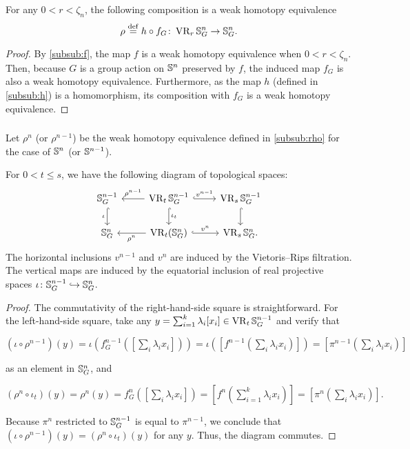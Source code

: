 \medskip\lemma
For any $0<r<\zeta_n$, the following composition is a weak homotopy equivalence
\[
\rho \stackrel{\mathrm{def}}{=} h \circ f_G
\colon \operatorname{VR}_r\mathbb{S}^n_G \to \mathbb{S}^n_G.
\]
\begin{proof}
	By \cref{subsub:f}, the map $f$ is a weak homotopy equivalence when $0<r<\zeta_n$.
	Then, because $G$ is a group action on $\mathbb{S}^n$ preserved by $f$, the induced map $f_G$ is also a weak homotopy equivalence.
	Furthermore, as the map $h$ (defined in \cref{subsub:h}) is a homomorphism, its composition with $f_G$ is a weak homotopy equivalence.
\end{proof}

\subsubsection{}

Let $\rho^n$ (or $\rho^{n-1}$) be the weak homotopy equivalence defined in \cref{subsub:rho} for the case of $\mathbb{S}^n$ (or $\mathbb{S}^{n-1}$).

\medskip\lemma
For $0<t\leq s $, we have the following diagram of topological spaces:
\begin{equation}\label{d:fundamental_bars_diagram}
	\begin{tikzcd}
		\bS^{n-1}_G
		\ar[d, hook,"{\iota}" left]
		&
		\VR_t\bS^{n-1}_G
		\ar[d, hook,"\iota_t"]
		\ar[l, "\rho^{n-1}" above]
		\ar[r, hook, "v^{n-1}"]
		&
		\VR_{s}\bS^{n-1}_G
		\ar[d, hook]
		\\
		\bS^{n}_G
		&
		\VR_t(\bS^{n}_G)
		\ar[l, "\rho^n" below]
		\ar[r, hook, "v^{n}"]
		&
		\VR_{s}\bS^{n}_G.
	\end{tikzcd}
\end{equation}
The horizontal inclusions $v^{n-1}$ and $v^n$ are induced by the Vietoris--Rips filtration.
The vertical maps are induced by the equatorial inclusion of real projective spaces $\iota \colon \mathbb{S}^{n-1}_G \hookrightarrow \mathbb{S}^{n}_G$.

\begin{proof}
	The commutativity of the right-hand-side square is straightforward.
	For the left-hand-side square, take any $y = \sum_{i=1}^k \lambda_i [x_i] \in \operatorname{VR}_t\mathbb{S}^{n-1}_G$ and verify that
	\begin{center}
		$(\iota \circ \rho^{n-1})(y)
		=\iota(f^{n-1}_G([\sum_i \lambda_i x_i]))
		=\iota([f^{n-1}(\sum_i \lambda_i x_i)])
		=[\pi^{n-1}(\sum_i \lambda_i x_i)]
		$
	\end{center}
	as an element in $\mathbb{S}^n_G$, and
	\begin{center}
		$(\rho^{n} \circ \iota_t)(y) = \rho^{n}(y) = f^{n}_G([\sum_i \lambda_i x_i]) = [f^{n}(\sum_{i=1}^k \lambda_i x_i)] = [\pi^{n}(\sum_i \lambda_i x_i)].
		$
	\end{center}
	Because $\pi^{n}$ restricted to $\mathbb{S}^{n-1}_G$ is equal to $\pi^{n-1}$, we conclude that $(\iota \circ \rho^{n-1})(y) = (\rho^n \circ \iota_t)(y)$ for any $y$.
	Thus, the diagram commutes.
\end{proof}

